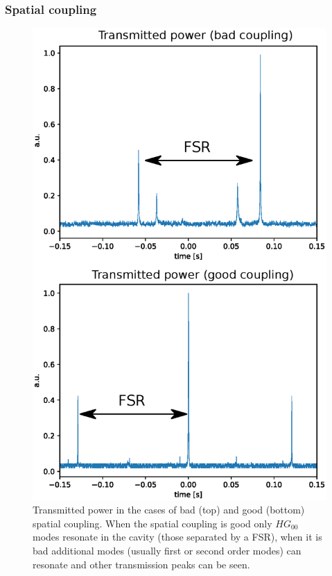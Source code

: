 \subsubsection{Spatial coupling}
\begin{figure}
	\centering
	\includegraphics[width=0.9\linewidth]{images/goodspa.eps}
	\caption{Transmitted power in the cases of bad (top) and good (bottom) spatial coupling. When the spatial coupling is good only $HG_{00}$ modes resonate in the cavity (those separated by a FSR), when it is bad additional modes (usually first or second order modes) can resonate and other transmission peaks can be seen.}
	\label{fig:goodspa}
\end{figure}


